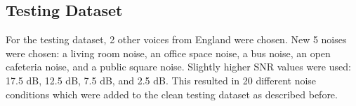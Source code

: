 \subsection{Testing Dataset}
For the testing dataset, 2 other voices from England were chosen. New 5 noises were chosen: a living room noise, an office space noise, a bus noise, an open cafeteria noise, and a public square noise. Slightly higher SNR values were used: 17.5 dB, 12.5 dB, 7.5 dB, and 2.5 dB. This resulted in 20 different noise conditions which were added to the clean testing dataset as described before.

